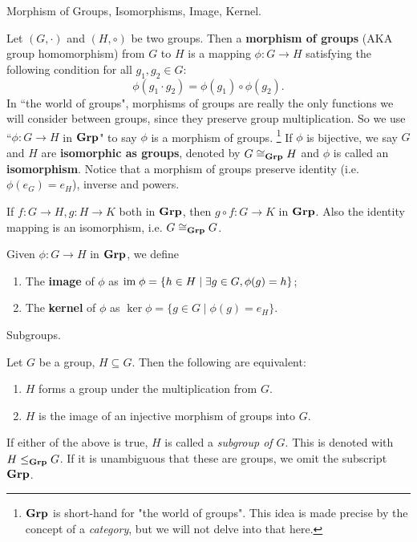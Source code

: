 \documentclass[../../book.tex]{subfiles}
\begin{document}
\begin{dfn} Morphism of Groups, Isomorphisms, Image, Kernel. 

Let $(G,\cdot)$ and $(H,\circ)$ be two groups. 
Then a \textbf{morphism of groups} (AKA group homomorphism) from $G$ to $H$ is a mapping $\phi : G \to H$ 
satisfying the following condition for all $g_1, g_2 \in G$:
\[\phi(g_1 \cdot g_2)=\phi(g_1) \circ \phi(g_2).\]
In ``the world of groups", 
morphisms of groups are really the only functions we will consider between groups,
since they preserve group multiplication. 
So we use ``$\phi : G \to H$ in $\mathbf{Grp}$" to say $\phi$ is a morphism of groups. 
\footnote{$\mathbf{Grp}$ is short-hand for "the world of groups".
    This idea is made precise by the concept of a \emph{category},
    but we will not delve into that here. 
}
If $\phi$ is bijective, we say $G$ and $H$ are \textbf{isomorphic as groups}, 
denoted by $G \cong_{\mathbf{Grp}} H$ and $\phi$ is called an \textbf{isomorphism}. 
Notice that a morphism of groups preserve identity (i.e. $\phi(e_G)=e_H$), 
inverse and powers.

If $f:G \to H, g: H \to K$ both in $\mathbf{Grp}$, then $g \circ f: G \to K$ in $\mathbf{Grp}$. 
Also the identity mapping is an isomorphism, i.e. $G \cong_{\mathbf{Grp}} G$.

Given $\phi: G \to H$ in $\mathbf{Grp}$, we define
\begin{enumerate}
    \item The \textbf{image} of $\phi$ as 
        $\textnormal{im}\; \phi=\{h \in H \mid \exists g \in G, \phi(g)=h\}$;
    \item The \textbf{kernel} of $\phi$ as 
        $\ker \phi=\{g \in G \mid \phi(g)=e_H\}$.
\end{enumerate}
\end{dfn}


\begin{dfn} Subgroups. 

    Let $G$ be a group, $H \subseteq G$.
    Then the following are equivalent: 
    \begin{enumerate}
        \item $H$ forms a group under the multiplication from $G$. 
        \item $H$ is the image of an injective morphism of groups into $G$. 
    \end{enumerate}
    If either of the above is true, $H$ is called a \emph{subgroup of $G$}.
    This is denoted with $H \leq_{\mathbf{Grp}} G$. 
    If it is unambiguous that these are groups,
    we omit the subscript $\mathbf{Grp}$. 
    
\end{dfn}
\end{document}
